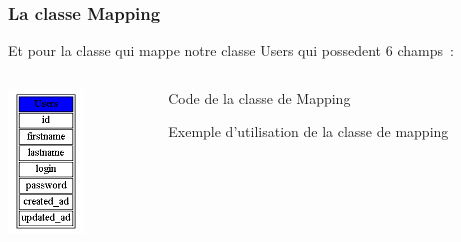 \documentclass{beamer}
\begin{document}
\begin{frame}
    \frametitle{La classe Mapping}
    Et pour la classe qui mappe notre classe Users qui possedent 6 champs~:
   
    \begin{columns}
        \begin{column}[l]{3cm}
            \includegraphics[width=20mm]{user.png}
        \end{column}
        
        \begin{column}[r]{10cm}
            \begin{block}{Code de la classe de Mapping}
                      
            \end{block}
            \begin{block}{Exemple d'utilisation de la classe de mapping}
                      
            \end{block}
        \end{column}
    \end{columns}

\end{frame}
\end{document}
